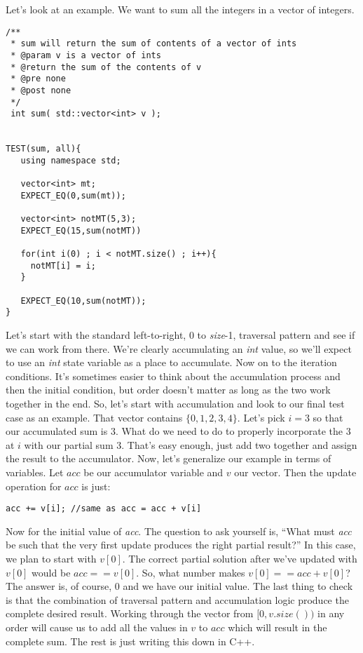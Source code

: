 \documentclass[]{tufte-handout}
\begin{document}
Let's look at an example. We want to sum all the integers in a vector of integers.  
\begin{verbatim}
/**
 * sum will return the sum of contents of a vector of ints
 * @param v is a vector of ints
 * @return the sum of the contents of v
 * @pre none
 * @post none
 */
 int sum( std::vector<int> v );


TEST(sum, all){
   using namespace std;  
   
   vector<int> mt;
   EXPECT_EQ(0,sum(mt));
   
   vector<int> notMT(5,3);
   EXPECT_EQ(15,sum(notMT))

   for(int i(0) ; i < notMT.size() ; i++){
     notMT[i] = i;
   }
   
   EXPECT_EQ(10,sum(notMT));
}

\end{verbatim}

Let's start with the standard left-to-right, 0 to \textit{size}-1, traversal pattern and see if we can work from there. We're clearly accumulating an \textit{int} value, so we'll expect to use an \textit{int} state variable as a place to accumulate. Now on to the iteration conditions. It's sometimes easier to think about the accumulation process and then the initial condition, but order doesn't matter as long as the two work together in the end. So, let's start with accumulation and look to our final test case as an example.  That vector contains $\{0,1,2,3,4\}$. Let's pick $i=3$ so that our accumulated sum is $3$\sidenote{the sum of everything in $[0,i)$}. What do we need to do to properly incorporate the $3$ at $i$ with our partial sum $3$.  That's easy enough, just add two together and assign the result to the accumulator. Now, let's generalize our example in terms of variables. Let $acc$ be our accumulator variable and $v$ our vector. Then the update operation for $acc$ is just:
\begin{verbatim}
acc += v[i]; //same as acc = acc + v[i]
\end{verbatim}
Now for the initial value of \textit{acc}. The question to ask yourself is, ``What must \textit{acc} be such that the very first update produces the right partial result?''  In this case, we plan to start with $v[0]$. The correct partial solution after we've updated with $v[0]$ would be $acc == v[0]$. So, what number makes $v[0] == acc + v[0]$? The answer is, of course, $0$ and we have our initial value. The last thing to check is that the combination of traversal pattern and accumulation logic produce the complete desired result.  Working through the vector from $[0,v.size())$ in any order will cause us to add all the values in $v$ to $acc$ which will result in the complete sum. The rest is just writing this down in C++.
\end{document}
